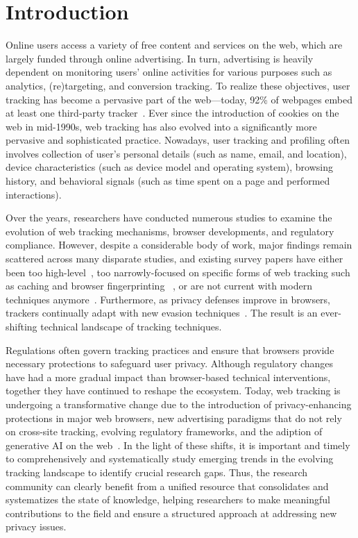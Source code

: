\section{Introduction}
\label{sec:introduction}

Online users access a variety of free content and services on the web, which are largely funded through online advertising.
%
In turn, advertising is heavily dependent on monitoring users' online activities for various purposes such as analytics, (re)targeting, and conversion tracking.
%
To realize these objectives, user tracking has become a pervasive part of the web---today, 92\% of webpages embed at least one third-party tracker~\cite{urban2024WebAlmanac2024}.
%
Ever since the introduction of cookies on the web in mid-1990s, web tracking has also evolved into a significantly more pervasive and sophisticated practice.
%
Nowadays, user tracking and profiling often involves collection of user's personal details (such as name, email, and location), device characteristics (such as device model and operating system), browsing history, and behavioral signals (such as time spent on a page and performed interactions).

Over the years, researchers have conducted numerous studies to examine the evolution of web tracking mechanisms, browser developments, and regulatory compliance.
%
However, despite a considerable body of work, major findings remain scattered across many disparate studies, and existing survey papers have either been too high-level~\cite{ermakova2018web}, too narrowly-focused on specific forms of web tracking
such as caching and browser fingerprinting
~\cite{bujlowSurveyWebTracking2017,laperdrix2020browser}, or are not current with modern techniques anymore~\cite{mayerThirdPartyWebTracking2012}.
%
Furthermore, as privacy defenses improve in browsers, trackers continually adapt with new evasion techniques~\cite{narayanan2018web,localmess-usenix-sec-26}.
%
The result is an ever-shifting technical landscape of tracking techniques.

Regulations often govern tracking practices and ensure that browsers provide necessary protections to safeguard user privacy.
%
Although regulatory changes have had a more gradual impact than browser-based technical interventions, together they have continued to reshape the ecosystem.
%
Today, web tracking is undergoing a transformative change due to the introduction of privacy-enhancing protections in major web browsers, new advertising paradigms that do not rely on cross-site tracking, evolving regulatory frameworks, and the adiption of generative AI on the web~\cite{hercherW3CAdPrivacy2022,chavezUpdatePlansPrivacy2025,builtin-ai}.
%
In the light of these shifts, it is important and timely to comprehensively and systematically study emerging trends in the evolving tracking landscape to identify crucial research gaps.
%
Thus, the research community can clearly benefit from a unified resource that consolidates and systematizes the state of knowledge, helping researchers to make meaningful contributions to the field and ensure a structured approach at addressing new privacy issues.


